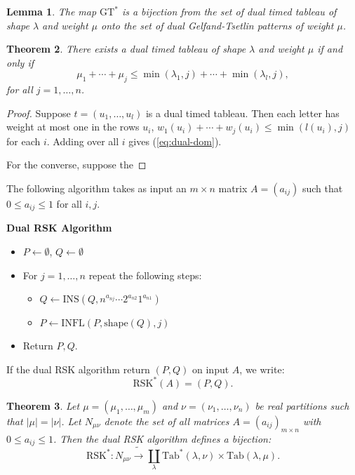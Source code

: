 \documentclass[12pt]{amsart}
\newcommand{\ins}{\mathrm{INS}}
\newcommand{\ttab}{\mathrm{Tab}}
\newcommand{\ot}{\leftarrow}
\newcommand{\infl}{\mathrm{INFL}}
\newcommand{\shape}{\mathrm{shape}}
\newcommand{\rsk}{\mathrm{RSK}}
\newcommand{\GT}{\mathrm{GT}}
\newtheorem{theorem}{Theorem}
\newtheorem{lemma}[theorem]{Lemma}
\theoremstyle{definition}
\begin{document}
\begin{lemma}
  The map $\GT^*$ is a bijection from the set of dual timed tableau of shape $\lambda$ and weight $\mu$ onto the set of dual Gelfand-Tsetlin patterns of weight $\mu$.
\end{lemma}
\begin{theorem}
  \label{theorem:feasibility-dual-timed-tab}
  There exists a dual timed tableau of shape $\lambda$ and weight $\mu$ if and only if
  \begin{equation}
    \label{eq:dual-dom}
    \mu_1+\dotsb + \mu_j \leq \min(\lambda_1,j) + \dotsb + \min(\lambda_l,j),
  \end{equation}
  for all $j=1,\dotsc,n$.
\end{theorem}
\begin{proof}
  Suppose $t=(u_1,\dotsc,u_l)$ is a dual timed tableau.
  Then each letter has weight at most one in the rows $u_i$, $w_1(u_i)+\dotsb + w_j(u_i)\leq \min(l(u_i), j)$ for each $i$.
  Adding over all $i$ gives (\ref{eq:dual-dom}).

  For the converse, suppose the 
\end{proof}
The following algorithm takes as input an $m\times n$ matrix $A=(a_{ij})$ such that $0\leq a_{ij}\leq 1$ for all $i,j$.
\begin{center}
  \textbf{Dual RSK Algorithm}
  \begin{itemize}
  \item $P\ot \emptyset$, $Q\ot\emptyset$
  \item For $j=1,\dotsc, n$ repeat the following steps:
    \begin{itemize}
    \item $Q\ot \ins(Q, n^{a_{nj}}\dotsb 2^{a_{n2}}1^{a_{n1}})$
    \item $P\ot \infl(P, \shape(Q), j)$
    \end{itemize}
  \item Return $P, Q$.
  \end{itemize}
\end{center}
If the dual RSK algorithm return $(P, Q)$ on input $A$, we write:
\begin{displaymath}
  \rsk^*(A) = (P, Q).
\end{displaymath}
\begin{theorem}
  \label{theorem:dual-rsk}
  Let $\mu=(\mu_1,\dotsc,\mu_m)$ and $\nu=(\nu_1,\dotsc,\nu_n)$ be real partitions such that $|\mu|=|\nu|$.
  Let $N_{\mu\nu}$ denote the set of all matrices $A=(a_{ij})_{m\times n}$ with $0\leq a_{ij}\leq 1$.
  Then the dual RSK algorithm defines a bijection:
  \begin{displaymath}
    \rsk^*: N_{\mu\nu}\tilde\to \coprod_\lambda \ttab^*(\lambda,\nu)\times \ttab(\lambda,\mu). 
  \end{displaymath}
\end{theorem}
\end{document}
